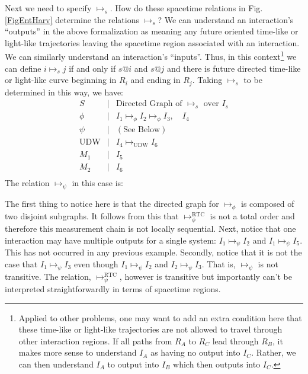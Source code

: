 \documentclass[prd,twocolumn,superscriptaddress,floatfix,amsmath,amssymb,amsfonts,nofootinbib]{revtex4-2}
\begin{document}
Next we need to specify $\mapsto_s$. How do these spacetime relations in Fig. \ref{FigEntHarv} determine the relations $\mapsto_s$? We can understand an interaction's ``outputs'' in the above formalization as meaning any future oriented time-like or light-like trajectories leaving the spacetime region associated with an interaction. We can similarly understand an interaction's ``inputs''. Thus, in this context\footnote{Applied to other problems, one may want to add an extra condition here that these time-like or light-like trajectories are not allowed to travel through other interaction regions. If all paths from $R_A$ to $R_C$ lead through $R_B$, it makes more sense to understand $I_A$ as having no output into $I_C$. Rather, we can then understand $I_A$ to output into $I_B$ which then outputs into $I_C$.} we can define $i\mapsto_s j$ if and only if $s@i$ and $s@j$ and there is future directed time-like or light-like curve beginning in $R_i$ and ending in $R_j$. Taking $\mapsto_s$ to be determined in this way, we have:
\[\begin{array}{ccl}
S & \vert & \text{Directed Graph of }\mapsto_s\text{ over }I_s\\
\phi & \vert & I_1\mapsto_\phi I_2\mapsto_\phi I_3, \quad I_4\\
\psi & \vert & (\text{See Below})\\
\text{UDW} & \vert & I_4\mapsto_\text{UDW} I_6\\
M_1 & \vert & I_5\\
M_2 & \vert & I_6\\
\end{array}\]
The relation $\mapsto_\psi$ in this case is:
\begin{center}
\end{center}
The first thing to notice here is that the directed graph for $\mapsto_\phi$ is composed of two disjoint subgraphs. It follows from this that $\mapsto_\phi^\text{RTC}$ is not a total order and therefore this measurement chain is not locally sequential. Next, notice that one interaction may have multiple outputs for a single system: $I_1\mapsto_\psi I_2$ and $I_1\mapsto_\psi I_5$. This has not occurred in any previous example. Secondly, notice that it is not the case that $I_1\mapsto_\psi I_3$ even though $I_1\mapsto_\psi I_2$ and $I_2\mapsto_\psi I_3$. That is, $\mapsto_\psi$ is not transitive. The relation, $\mapsto_\psi^\text{RTC}$, however is transitive but importantly can't be interpreted straightforwardly in terms of spacetime regions.
\end{document}
